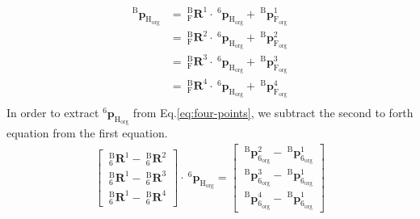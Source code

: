 \begin{equation}
\begin{split}																									
^\mathrm{B}\!\boldsymbol{p}_\mathrm{H_{org}}&=\  _{\mathrm{F}}^{\mathrm{B}}\mathbf{R}^1 \cdot\ ^\mathrm{6}\!\boldsymbol{p}_\mathrm{H_{org}} +\ ^\mathrm{B}\!\boldsymbol{p}_\mathrm{F_{org}}^1\\
					  						&=\  _{\mathrm{F}}^{\mathrm{B}}\mathbf{R}^2 \cdot\ ^\mathrm{6}\!\boldsymbol{p}_\mathrm{H_{org}} +\ ^\mathrm{B}\!\boldsymbol{p}_\mathrm{F_{org}}^2\\
					  						&=\  _{\mathrm{F}}^{\mathrm{B}}\mathbf{R}^3 \cdot\ ^\mathrm{6}\!\boldsymbol{p}_\mathrm{H_{org}} +\ ^\mathrm{B}\!\boldsymbol{p}_\mathrm{F_{org}}^3\\
					 					 	&=\  _{\mathrm{F}}^{\mathrm{B}}\mathbf{R}^4 \cdot\ ^\mathrm{6}\!\boldsymbol{p}_\mathrm{H_{org}} +\ ^\mathrm{B}\!\boldsymbol{p}_\mathrm{F_{org}}^4\\
\end{split}\label{eq:four-points}
\end{equation}
In order to extract $^\mathrm{6}\!\boldsymbol{p}_\mathrm{H_{org}}$ from Eq.\ref{eq:four-points}, we subtract the second to forth equation from the first equation.
\begin{equation}
\begin{split}	
\begin{bmatrix}
\  _{\mathrm{6}}^{\mathrm{B}}\mathbf{R}^{1} - \  _{\mathrm{6}}^{\mathrm{B}}\mathbf{R}^{2}\\ 
\  _{\mathrm{6}}^{\mathrm{B}}\mathbf{R}^{1} - \  _{\mathrm{6}}^{\mathrm{B}}\mathbf{R}^{3}\\ 
\  _{\mathrm{6}}^{\mathrm{B}}\mathbf{R}^{1} - \  _{\mathrm{6}}^{\mathrm{B}}\mathbf{R}^{4}
\end{bmatrix}
\cdot\ ^\mathrm{6}\!\boldsymbol{p}_\mathrm{H_{org}}
=
\begin{bmatrix}
\ ^\mathrm{B}\!\boldsymbol{p}_\mathrm{6_{org}}^{2} -\ ^\mathrm{B}\!\boldsymbol{p}_\mathrm{6_{org}}^{1} \\ 
\ ^\mathrm{B}\!\boldsymbol{p}_\mathrm{6_{org}}^{3} -\ ^\mathrm{B}\!\boldsymbol{p}_\mathrm{6_{org}}^{1} \\ 
\ ^\mathrm{B}\!\boldsymbol{p}_\mathrm{6_{org}}^{4} -\ ^\mathrm{B}\!\boldsymbol{p}_\mathrm{6_{org}}^{1} 
\end{bmatrix}
\end{split}
\end{equation}
